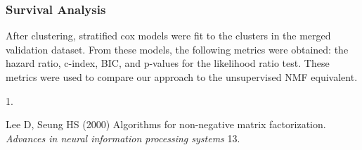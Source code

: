 \documentclass[9pt,twocolumn,twoside,]{pnas-new}
\newlength{\cslhangindent}
\newlength{\csllabelwidth}
\newenvironment{CSLReferences}[2] %
 {\begin{list}{}{%
  \setlength{\itemindent}{0pt}
  \setlength{\leftmargin}{0pt}
  \setlength{\parsep}{0pt}
  \ifodd #1
   \setlength{\leftmargin}{\cslhangindent}
   \setlength{\itemindent}{-1\cslhangindent}
  \fi
  \setlength{\itemsep}{#2\baselineskip}}}
 {\end{list}}
\newcommand{\CSLLeftMargin}[1]{\parbox[t]{\csllabelwidth}{#1}}
\newcommand{\CSLRightInline}[1]{\parbox[t]{\linewidth - \csllabelwidth}{#1}\break}
\begin{document}
\subsubsection{Survival Analysis}

After clustering, stratified cox models were fit to the clusters in the
merged validation dataset. From these models, the following metrics were
obtained: the hazard ratio, c-index, BIC, and p-values for the
likelihood ratio test. These metrics were used to compare our approach
to the unsupervised NMF equivalent.

\showmatmethods
\showacknow
\pnasbreak

\label{refs}
\begin{CSLReferences}{0}{1}
\CSLLeftMargin{1. }%
\CSLRightInline{Lee D, Seung HS (2000) Algorithms for non-negative
matrix factorization. \emph{Advances in neural information processing
systems} 13.}

\end{CSLReferences}



% 
\end{document}

